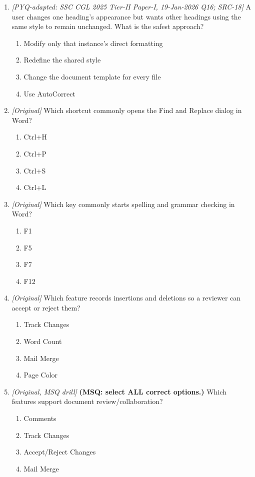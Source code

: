 \begin{enumerate}[label=\textbf{Q\arabic*.}, leftmargin=*]
\begin{enumerate}[label=\Alph*.]
  \end{enumerate}
\item \textit{[PYQ-adapted: SSC CGL 2025 Tier-II Paper-I, 19-Jan-2026 Q16; SRC-18]} A user changes one heading's appearance but wants other headings using the same style to remain unchanged. What is the safest approach?
  \begin{enumerate}[label=\Alph*.]
\item Modify only that instance's direct formatting
   \item Redefine the shared style
   \item Change the document template for every file
   \item Use AutoCorrect
  \end{enumerate}

\item \textit{[Original]} Which shortcut commonly opens the Find and Replace dialog in Word?
  \begin{enumerate}[label=\Alph*.]
\item Ctrl+H
   \item Ctrl+P
   \item Ctrl+S
   \item Ctrl+L
  \end{enumerate}

\item \textit{[Original]} Which key commonly starts spelling and grammar checking in Word?
  \begin{enumerate}[label=\Alph*.]
\item F1
   \item F5
   \item F7
   \item F12
  \end{enumerate}

\item \textit{[Original]} Which feature records insertions and deletions so a reviewer can accept or reject them?
  \begin{enumerate}[label=\Alph*.]
\item Track Changes
   \item Word Count
   \item Mail Merge
   \item Page Color
  \end{enumerate}

\item \textit{[Original, MSQ drill]} \textbf{(MSQ: select ALL correct options.)} Which features support document review/collaboration?
  \begin{enumerate}[label=\Alph*.]
\item Comments
   \item Track Changes
   \item Accept/Reject Changes
   \item Mail Merge
  \end{enumerate}

\end{enumerate}

